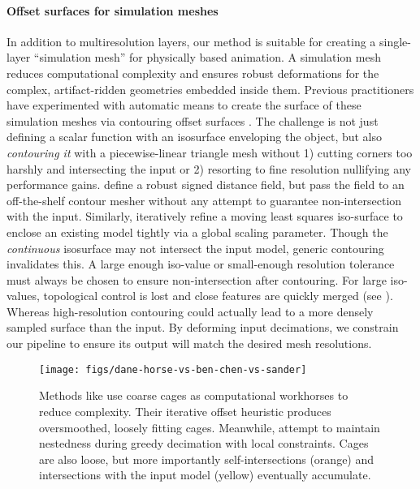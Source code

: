 \paragraph{Offset surfaces for simulation meshes}
In addition to multiresolution layers, our method is suitable for creating a
single-layer ``simulation mesh'' for physically based animation.
%
A simulation mesh reduces computational complexity and ensures robust
deformations for the complex, artifact-ridden geometries embedded inside them.
%
Previous practitioners have experimented with automatic means to create the
surface of these simulation meshes via contouring offset surfaces
\cite{Campen:2010}.
%
The challenge is not just defining a scalar function with an isosurface
enveloping the object, but also \emph{contouring it} with a piecewise-linear
triangle mesh without 1) cutting corners too harshly and intersecting the input
or 2) resorting to fine resolution nullifying any performance gains.
%
\cite{Xu:2014:SDF} define a robust signed distance field, but
pass the field to an off-the-shelf contour mesher without any attempt to
guarantee non-intersection with the input.
%
Similarly, \cite{Shen:2004:IAI} iteratively refine a moving
least squares iso-surface to enclose an existing model tightly via a global
scaling parameter. Though the \emph{continuous}
isosurface may not intersect the input model, generic contouring invalidates
this.
%
A large enough iso-value or small-enough resolution tolerance must always be
chosen to ensure non-intersection after contouring.
%
For large iso-values, topological control is lost and close features are
quickly merged (see ).
%
Whereas high-resolution contouring could actually lead to a more densely sampled
surface than the input.
%
By deforming input decimations, we constrain our pipeline to ensure its output
will match the desired mesh resolutions. 



\begin{figure}
  \texttt{[image: figs/dane-horse-vs-ben-chen-vs-sander]}
  \caption{Methods like \protect\cite{Ben-Chen:2009:SDT} use coarse cages as
  computational workhorses to reduce complexity. Their iterative offset
  heuristic produces oversmoothed, loosely fitting cages.
  Meanwhile, \protect\cite{Sander:2000:SC} attempt to
  maintain nestedness during greedy decimation with local constraints. Cages
  are also loose, but more importantly self-intersections (orange) and
  intersections with the input model (yellow) eventually accumulate.}
  \label{fig:dane-vs-ben-chen}
\end{figure}

